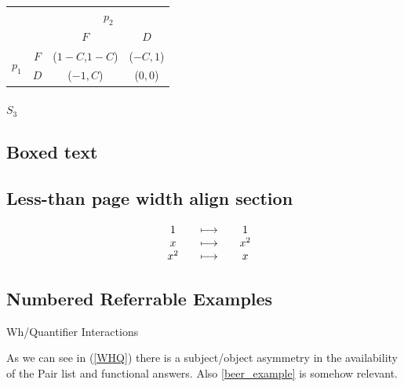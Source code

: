 \documentclass[MathsNotesBase.tex]{subfiles}
\begin{document}
	\begin{tabular}[h!]{*4c}
		& &\multicolumn{2}{c}{$p_{2}$}\\
		& & $F$ &$D$ \\\cline{3-4}
		\multirow{2}{*}{$p_{1}$}& $F$ & \multicolumn{1}{|c|}{($1-C$,$1-C$)} & \multicolumn{1}{c|}{($-C,1$)} \\\cline{3-4}
		& $D$ & \multicolumn{1}{|c|}{($-1,C$)} &\multicolumn{1}{c|}{($0,0$)}\\\cline{3-4}
	\end{tabular}
	\subparagraph{$S_3$}
	
	\subsection{Boxed text}
	\noindent{}\bigskip

	\subsection{Less-than page width align section}
	\[\begin{array}{*6c}
	&1 &&\longmapsto &&1 \\
	&x &&\longmapsto &&x^2 \\
	&x^2 &&\longmapsto &&x \\
	\end{array}\]
	
	\subsection{Numbered Referrable Examples}
	\begin{exe}
		\ex Wh/Quantifier Interactions\label{WHQ}
		\begin{xlist}
			\begin{xlist}
				 \label{beer_example}
			\end{xlist}
		\end{xlist}
	\end{exe}
	As we can see in (\ref{WHQ}) there is a subject/object asymmetry in the availability of the Pair list and functional answers. Also \ref{beer_example} is somehow relevant.
\end{document}
